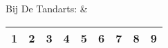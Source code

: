Bij De Tandarts: &
\begin{tabular}{|c|c|c|c|c|c|c|c|c|}
	\hline 
	\textbf{1} & \textbf{2} & \textbf{3} & \textbf{4} & \textbf{5} & \textbf{6} & \textbf{7} & \textbf{8} & \textbf{9} \\
	\hline 
\end{tabular} \\